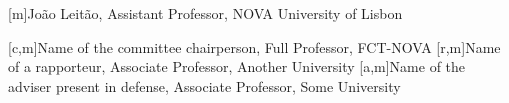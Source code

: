 


[m]{{João Leitão, Assistant Professor, NOVA University of Lisbon}}


[c,m]{Name of the committee chairperson, Full Professor, FCT-NOVA}
[r,m]{Name of a rapporteur, Associate Professor, Another University}
[a,m]{Name of the adviser present in defense, Associate Professor, Some University}
